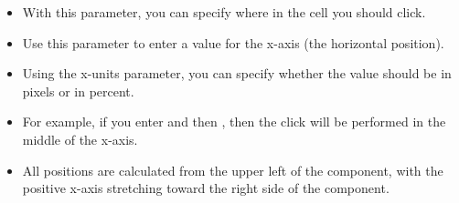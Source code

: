 
\begin{itemize}
\item With this parameter, you can specify where in the cell you should click.
\item Use this parameter to enter a value for the x-axis (the horizontal position).
\item Using the x-units parameter, you can specify whether the value should be in pixels or in percent. 
\item For example, if you enter  and then , then the click will be performed in the middle of the x-axis.
\item All positions are calculated from the upper left of the component, with the positive x-axis stretching toward the right side of the component.
\end{itemize}
